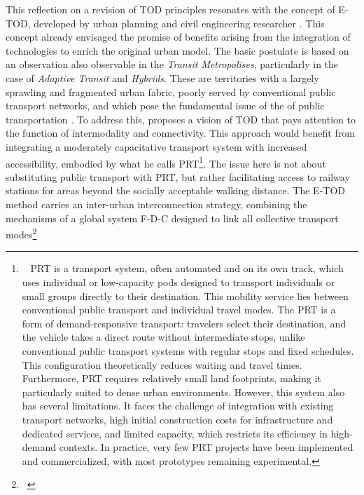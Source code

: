 \begin{refsegment}
\begin{customitemize}
    \end{customitemize}%

This reflection on a revision of \acrshort{TOD} principles resonates with the concept of \acrfull{E-TOD}, developed by urban planning and civil engineering researcher \textcolor{blue}{\textcite{schneider_illustrating_2012}}. This concept already envisaged the promise of benefits arising from the integration of technologies to enrich the original urban model. The basic postulate is based on an observation also observable in the \textsl{Transit Metropolises}, particularly in the case of \textsl{Adaptive Transit} and \textsl{Hybrids}. These are territories with a largely sprawling and fragmented urban fabric, poorly served by conventional public transport networks, and which pose the fundamental issue of the  of public transportation \textcolor{blue}{\autocite[133]{cervero_transit_2020}}. To address this, \textcolor{blue}{\textcite[141]{schneider_prt_1992}} proposes a vision of \acrshort{TOD} that pays attention to the function of intermodality and connectivity. This approach would benefit from integrating a moderately capacitative transport system with increased accessibility, embodied by what he calls \acrfull{PRT}\footnote{~
    \acrfull{PRT} is a transport system, often automated and on its own track, which uses individual or low-capacity pods designed to transport individuals or small groups directly to their destination. This mobility service lies between conventional public transport and individual travel modes. The \acrshort{PRT} is a form of demand-responsive transport: travelers select their destination, and the vehicle takes a direct route without intermediate stops, unlike conventional public transport systems with regular stops and fixed schedules. This configuration theoretically reduces waiting and travel times. Furthermore, \acrshort{PRT} requires relatively small land footprints, making it particularly suited to dense urban environments. However, this system also has several limitations. It faces the challenge of integration with existing transport networks, high initial construction costs for infrastructure and dedicated services, and limited capacity, which restricts its efficiency in high-demand contexts. In practice, very few \acrshort{PRT} projects have been implemented and commercialized, with most prototypes remaining experimental.
}. The issue here is not about substituting public transport with \acrshort{PRT}, but rather facilitating access to railway stations for areas beyond the socially acceptable walking distance. The \acrshort{E-TOD} method carries an inter-urban interconnection strategy, combining the mechanisms of a global system \acrfull{F-D-C} designed to link all collective transport modes\footnote{~
}
\end{refsegment}

